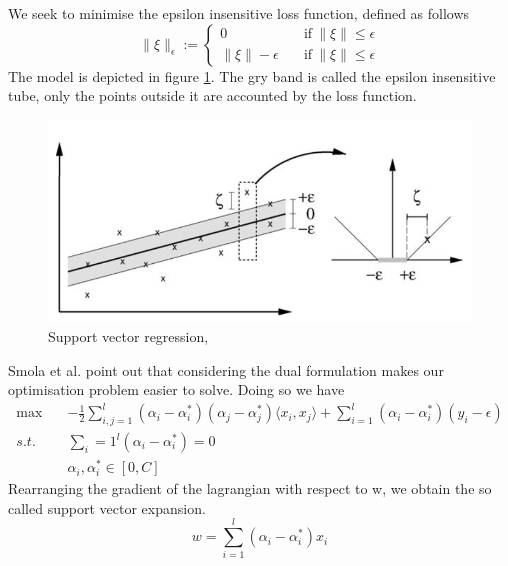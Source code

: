 We seek to minimise the epsilon insensitive loss function, defined as follows
\begin{equation}
    \|\xi\|_\epsilon:=\begin{cases}
        0 \quad& \textrm{if} \ \|\xi\|\leq \epsilon
        \\
        \|\xi\|-\epsilon \quad& \textrm{if} \ \|\xi\|\leq \epsilon
    \end{cases}
\end{equation}
The model is depicted in figure \ref{fig:svm_simple}. The gry band is called the epsilon insensitive tube, only the points outside it are accounted by the loss function.
\begin{figure}
    \includegraphics[width=\textwidth]{images/svm_simple.png}    
    \caption{Support vector regression,\cite{learning_with_kernels}}
    \label{fig:svm_simple}
\end{figure}
Smola et al. \cite{smola2004tutorial} point out that considering the dual formulation makes our optimisation problem easier to solve. Doing so we have
\begin{equation}
    \begin{aligned}
        \max \quad& -\frac{1}{2}\sum\limits_{i,j=1}^l(\alpha_i-\alpha_i^*)(\alpha_j-\alpha_j^*)\langle x_i,x_j\rangle +\sum\limits_{i=1}^l(\alpha_i-\alpha_i^*)(y_i-\epsilon)
        \\
        s.t. \quad& \sum\limits_i=1^l(\alpha_i-\alpha_i^*)=0
        \\
        \quad& \alpha_i, \alpha_i^* \in [0, C]
    \end{aligned}
\end{equation}
Rearranging the gradient of the lagrangian with respect to w, we obtain the so called support vector expansion.
\begin{equation}\label{eq:support vector expansion}
    w=\sum\limits_{i=1}^l(\alpha_i-\alpha_i^*)x_i
\end{equation}
